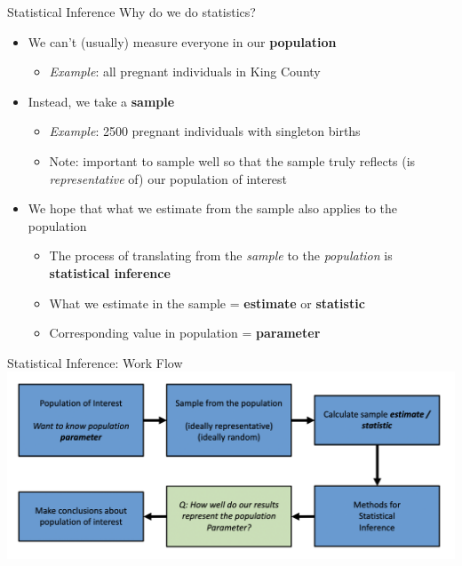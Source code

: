 \documentclass[10pt,t]{beamer}
\begin{document}
\begin{frame}{Statistical Inference}
Why do we do statistics?

\begin{itemize}
	\item We can't (usually) measure everyone in our \textbf{population}
	\begin{itemize}
		\item \textit{Example}: all pregnant individuals in King County
	\end{itemize}
	\item Instead, we take a \textbf{sample}
	\begin{itemize}
		\item \textit{Example}: 2500 pregnant individuals with singleton births
		\item Note: important to sample well so that the sample truly reflects (is \textit{representative} of) our population of interest
	\end{itemize}
	\item We hope that what we estimate from the sample also applies to the population
	\begin{itemize}
		\item The process of translating from the \textit{sample} to the \textit{population} is \textbf{statistical inference}
		\item What we estimate in the sample = \textbf{estimate} or \textbf{statistic}
		\item Corresponding value in population = \textbf{parameter}
	\end{itemize}
\end{itemize}
\end{frame}

\begin{frame}[c]{Statistical Inference: Work Flow}
\centering \includegraphics[scale=0.4]{statinference_workflow.png}
\end{frame}
\end{document}
